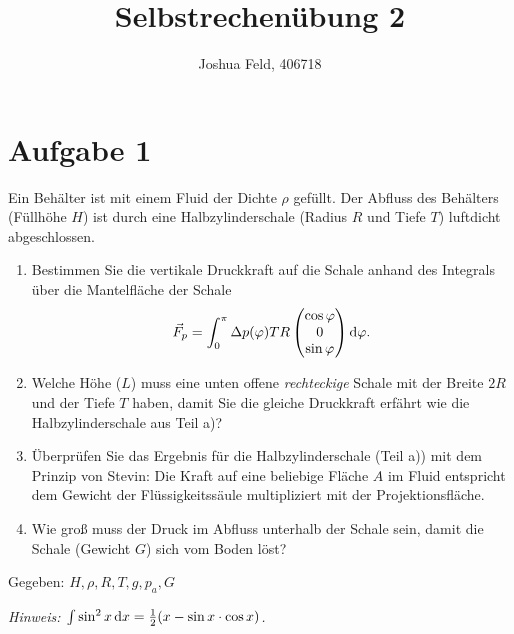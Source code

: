 \documentclass{exercise}
\institute{Lehrstuhl für Strömungslehre und Aerodynamisches Institut}
\title{Selbstrechenübung 2}
\author{Joshua Feld, 406718}
\begin{document}
    \maketitle

    
    \section*{Aufgabe 1}
    
    \begin{problem}
        Ein Behälter ist mit einem Fluid der Dichte \(\rho\) gefüllt.
        Der Abfluss des Behälters (Füllhöhe \(H\)) ist durch eine Halbzylinderschale (Radius \(R\) und Tiefe \(T\)) luftdicht abgeschlossen.
        \begin{enumerate}
            \item Bestimmen Sie die vertikale Druckkraft auf die Schale anhand des Integrals über die Mantelfläche der Schale
            \[
                \vec{F}_p = \int_0^\pi \Delta p\parentheses*{\varphi}TR\begin{pmatrix}
                    \cos\varphi\\
                    0\\
                    \sin\varphi
                \end{pmatrix}\d\varphi.
            \]
            \item Welche Höhe (\(L\)) muss eine unten offene \emph{rechteckige} Schale mit der Breite \(2R\) und der Tiefe \(T\) haben, damit Sie die gleiche Druckkraft erfährt wie die Halbzylinderschale aus Teil a)?
            \item Überprüfen Sie das Ergebnis für die Halbzylinderschale (Teil a)) mit dem Prinzip von Stevin: Die Kraft auf eine beliebige Fläche \(A\) im Fluid entspricht dem Gewicht der Flüssigkeitssäule multipliziert mit der Projektionsfläche.
            \item Wie groß muss der Druck im Abfluss unterhalb der Schale sein, damit die Schale (Gewicht \(G\)) sich vom Boden löst?
        \end{enumerate}
        Gegeben: \(H, \rho, R, T, g, p_a, G\)
        
        \emph{Hinweis: \(\int\sin^2 x\d x = \frac{1}{2}\parentheses*{x - \sin x \cdot \cos x}\).}
    \end{problem}
    
\end{document}

